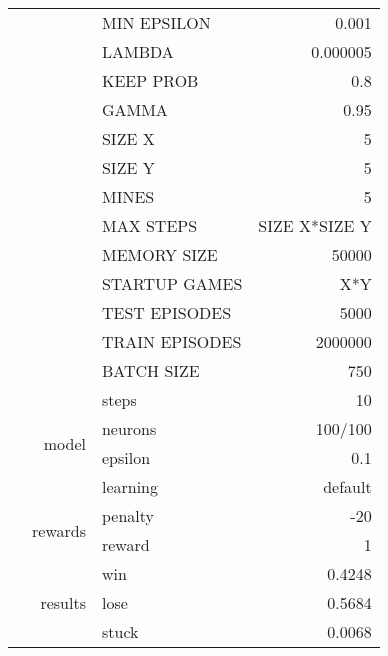 \documentclass{article}
\begin{document}
\begin{tabularx}{\textwidth}{l|r|X|r}
	& & MIN EPSILON	& 0.001 \\
	& & LAMBDA & 0.000005 \\
	& & KEEP PROB & 0.8 \\
	& & GAMMA	& 0.95 \\
	& & SIZE X & 5 \\
	& & SIZE Y & 5 \\
	& & MINES & 5 \\
	& & MAX STEPS & SIZE X*SIZE Y\\
	& & MEMORY SIZE & 50000 \\
	& & STARTUP GAMES & X*Y \\
	& & TEST EPISODES & 5000 \\
	& & TRAIN EPISODES & 2000000 \\
	& & BATCH SIZE & 750 \\
	& & steps & 10\\\cline{2-4}
	& \multirow{2}{*}{model} & neurons & 100/100 \\ 
	& & epsilon & 0.1\\
	& & learning & default \\\cline{2-4}
	& \multirow{2}{*}{rewards} & penalty & -20\\
	& & reward& 1\\\cline{2-4}
	& \multirow{3}{*}{results} & win & 0.4248 \\
	& & lose & 0.5684 \\
	& & stuck & 0.0068 \\
	\hline
\end{tabularx}
\end{document}
